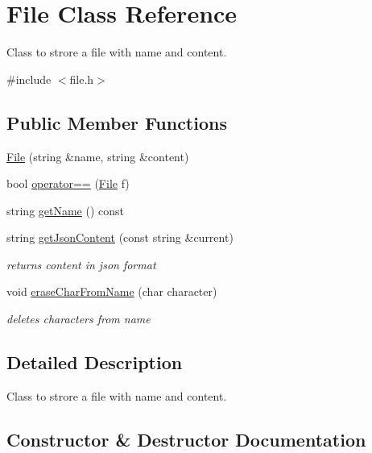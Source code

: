 \hypertarget{class_file}{}\section{File Class Reference}
\label{class_file}


Class to strore a file with name and content.  




{\ttfamily \#include $<$file.\+h$>$}

\subsection*{Public Member Functions}
\begin{DoxyCompactItemize}
\item 
\hyperlink{class_file_a87347ffc1d8cf9544036837353e37248}{File} (string \&name, string \&content)
\item 
bool \hyperlink{class_file_aadbe64432e7e403f546ff35a3bfa8d97}{operator==} (\hyperlink{class_file}{File} f)
\item 
string \hyperlink{class_file_a4b6032847dfd076db8ed44a532387f07}{get\+Name} () const
\item 
string \hyperlink{class_file_afaee512326a13dc99d6b8d08522eabe8}{get\+Json\+Content} (const string \&current)
\begin{DoxyCompactList}\small\item\em returns content in json format \end{DoxyCompactList}\item 
void \hyperlink{class_file_aef2ef41308caf6124548ed6421b91188}{erase\+Char\+From\+Name} (char character)
\begin{DoxyCompactList}\small\item\em deletes characters from name \end{DoxyCompactList}\end{DoxyCompactItemize}


\subsection{Detailed Description}
Class to strore a file with name and content. 

\subsection{Constructor \& Destructor Documentation}
\mbox{\label{class_file_a87347ffc1d8cf9544036837353e37248}} 
